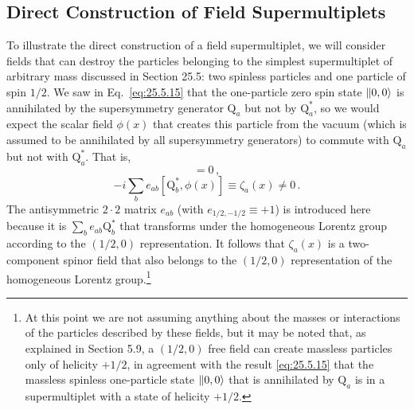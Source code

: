 
\subsection{Direct Construction of Field Supermultiplets}

\providecommand{\WeylQ}{\mathrm{Q}}
\providecommand{\MajoranaQ}{Q}

To illustrate the direct construction of a field supermultiplet, we will
consider fields that can destroy the particles belonging to the simplest
supermultiplet of arbitrary mass discussed in Section 25.5: two spinless
particles and one particle of spin \(1/2\). We saw in
Eq.~\eqref{eq:25.5.15} that the one-particle zero spin state \(\lVert 0,0\rangle\) is
annihilated by the supersymmetry generator \(\WeylQ_a\) but not by
\(\WeylQ_a^*\), so we would expect the scalar field \(\phi(x)\) that creates
this particle from the vacuum (which is assumed to be annihilated by all
supersymmetry generators) to commute with \(\WeylQ_a\) but not with
\(\WeylQ_a^*\). That is,
\begin{equation}
  [\WeylQ_a,\phi(x)]=0\,,
  \tag{26.1.1}\label{eq:26.1.1}
\end{equation}
\begin{equation}
  -i\sum_b e_{ab}[\WeylQ_b^*,\phi(x)]
  \equiv\zeta_a(x)\ne0\,.
  \tag{26.1.2}\label{eq:26.1.2}
\end{equation}
The antisymmetric \(2\cdot2\) matrix \(e_{ab}\) (with
\(e_{1/2,-1/2}\equiv+1\)) is introduced here because it is
\(\sum_b e_{ab}\WeylQ_b^*\) that transforms under the homogeneous Lorentz
group according to the \((1/2,0)\) representation. It follows that
\(\zeta_a(x)\) is a two-component spinor field that also belongs to the
\((1/2,0)\) representation of the homogeneous Lorentz group.\footnote{At
this point we are not assuming anything about the masses or interactions of
the particles described by these fields, but it may be noted that, as
explained in Section 5.9, a \((1/2,0)\) free field can create massless
particles only of helicity \(+1/2\), in agreement with the result
\eqref{eq:25.5.15} that the massless spinless one-particle state
\(\lVert 0,0\rangle\) that is annihilated by \(\WeylQ_a\) is in a supermultiplet
with a state of helicity \(+1/2\).}

